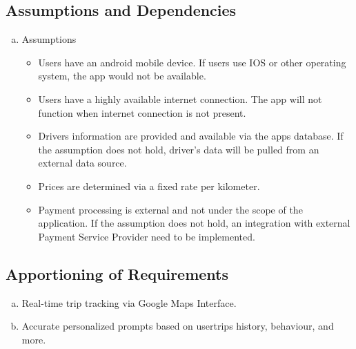 \documentclass[]{article}
\begin{document}

\subsection{Assumptions and Dependencies}
\label{sub:assumptions_and_dependencies}


\begin{enumerate}[a)]
	\item Assumptions

	\begin{itemize}
		\item Users have an android mobile device. If users use IOS or other operating system, the app would not be available.
		\item Users have a highly available internet connection. The app will not function when internet connection is not present.
		\item Drivers information are provided and available via the app\textquotesingle s database. If the assumption does not hold, driver's data will be pulled from an external data source.
		\item Prices are determined via a fixed rate per kilometer.
		\item Payment processing is external and not under the scope of the application. If the assumption does not hold, an integration with external Payment Service Provider need to be implemented.
	\end{itemize}

\end{enumerate}

\subsection{Apportioning of Requirements}
\label{sub:apportioning_of_requirements}

\begin{enumerate}[a)]
	\item Real-time trip tracking via Google Maps Interface.
	\item Accurate personalized prompts based on user\textquotesingle trips history, behaviour, and more. 
\end{enumerate}


\end{document}
